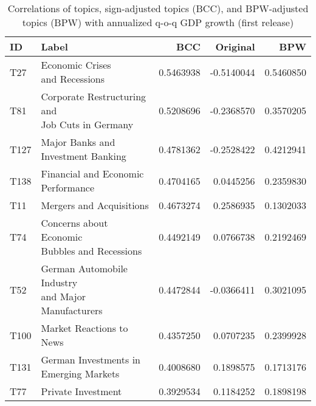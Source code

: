 \begin{table}[!h]
\centering
\caption{Correlations of topics, sign-adjusted topics (BCC), and BPW-adjusted topics (BPW) with annualized q-o-q GDP growth (first release)}
\centering
\begin{tabular}[t]{llrrr}
\toprule
ID & Label & BCC & Original & BPW\\
\midrule
T27 & \makecell[tl]{ Economic Crises \\ and Recessions} & 0.5463938 & -0.5140044 & 0.5460850\\
T81 & \makecell[tl]{ Corporate Restructuring and \\ Job Cuts in Germany} & 0.5208696 & -0.2368570 & 0.3570205\\
T127 & \makecell[tl]{ Major Banks and \\ Investment Banking} & 0.4781362 & -0.2528422 & 0.4212941\\
T138 & \makecell[tl]{ Financial and Economic \\ Performance} & 0.4704165 & 0.0445256 & 0.2359830\\
T11 & Mergers and Acquisitions & 0.4673274 & 0.2586935 & 0.1302033\\
\addlinespace
T74 & \makecell[tl]{ Concerns about Economic\\ Bubbles and Recessions} & 0.4492149 & 0.0766738 & 0.2192469\\
T52 & \makecell[tl]{ German Automobile Industry \\ and Major Manufacturers} & 0.4472844 & -0.0366411 & 0.3021095\\
T100 & \makecell[tl]{ Market Reactions to \\News} & 0.4357250 & 0.0707235 & 0.2399928\\
T131 & \makecell[tl]{German Investments in \\ Emerging Markets} & 0.4008680 & 0.1898575 & 0.1713176\\
T77 & Private Investment & 0.3929534 & 0.1184252 & 0.1898198\\
\bottomrule
\end{tabular}
\end{table}
